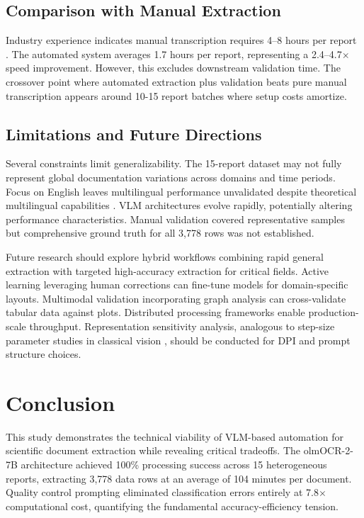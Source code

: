 \documentclass[conference]{IEEEtran}
\begin{document}
\subsection{Comparison with Manual Extraction}

Industry experience indicates manual transcription requires 4--8 hours per report \cite{schilling2024}. The automated system averages 1.7 hours per report, representing a 2.4--4.7$\times$ speed improvement. However, this excludes downstream validation time. The crossover point where automated extraction plus validation beats pure manual transcription appears around 10-15 report batches where setup costs amortize.

\subsection{Limitations and Future Directions}

Several constraints limit generalizability. The 15-report dataset may not fully represent global documentation variations across domains and time periods. Focus on English leaves multilingual performance unvalidated despite theoretical multilingual capabilities \cite{wen2023}. VLM architectures evolve rapidly, potentially altering performance characteristics. Manual validation covered representative samples but comprehensive ground truth for all 3,778 rows was not established.

Future research should explore hybrid workflows combining rapid general extraction with targeted high-accuracy extraction for critical fields. Active learning leveraging human corrections can fine-tune models for domain-specific layouts. Multimodal validation incorporating graph analysis can cross-validate tabular data against plots. Distributed processing frameworks enable production-scale throughput. Representation sensitivity analysis, analogous to step-size parameter studies in classical vision \cite{dargham2010}, should be conducted for DPI and prompt structure choices.

\section{Conclusion}

This study demonstrates the technical viability of VLM-based automation for scientific document extraction while revealing critical tradeoffs. The olmOCR-2-7B architecture achieved 100\% processing success across 15 heterogeneous reports, extracting 3,778 data rows at an average of 104 minutes per document. Quality control prompting eliminated classification errors entirely at 7.8$\times$ computational cost, quantifying the fundamental accuracy-efficiency tension.
\end{document}
